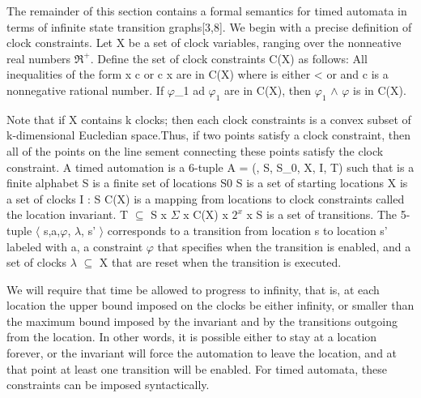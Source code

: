 The remainder of this section contains a formal semantics for timed automata in terms of infinite state transition graphs[3,8]. We begin with a precise definition of clock constraints. Let X be a set of clock variables, ranging over the nonneative real numbers $\Re^{+}$. Define the set of clock constraints C(X) as follows:
All inequalities of the form x \prec c or c \prec x are in C(X) where \prec is either < or  \leq \sm and c is a nonnegative rational number.
If $\varphi$_1 ad $\varphi_{1}$ are in C(X), then $\varphi_1$ $\wedge$ $\varphi$ is in C(X).

Note that if X contains k clocks; then each clock constraints is a convex subset of k-dimensional Eucledian space.Thus, if two points satisfy a clock constraint, then all of the points	on the line sement connecting these points satisfy the clock constraint.
A timed automation is a 6-tuple A = (\Sigma, S, S_0, X, I, T) such that
\Sigma is a finite alphabet
S is a finite set of locations
S0 \subseteq S is a set of starting locations
X is a set of clocks
I : S \rightarrow C(X) is a mapping from locations to clock constraints called the location invariant.
T $\subseteq$ S x $\Sigma$ x C(X) x $2^{x}$ x S is a set of transitions. The 5-tuple $\langle$ s,a,$\varphi$, $\lambda$, s' $\rangle$ corresponds to a transition from location s to location s' labeled with a, a constraint $\varphi$ that specifies when the transition is enabled, and a set of clocks $\lambda$ $\subseteq$ X that  are reset when the transition is executed.


We will require that time be allowed to progress to infinity, that is, at each location the upper bound imposed on the clocks be either infinity, or smaller than the maximum bound imposed by the invariant and by the transitions outgoing from the location. In other words, it is possible either to stay at a location forever, or the invariant will force the automation to leave the location, and at that point at least one transition will be enabled. For timed automata, these constraints can be imposed syntactically.


